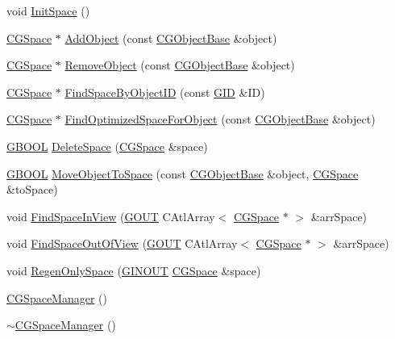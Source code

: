 \begin{DoxyCompactItemize}
void \hyperlink{class_c_g_space_manager_a8ce8e485ec6fcbe1c0d553822cd8e6be}{Init\+Space} ()
\item 
\hyperlink{class_c_g_space}{C\+G\+Space} $\ast$ \hyperlink{class_c_g_space_manager_adb22f39dc9ff5d643a80b4559859cb2b}{Add\+Object} (const \hyperlink{class_c_g_object_base}{C\+G\+Object\+Base} \&object)
\item 
\hyperlink{class_c_g_space}{C\+G\+Space} $\ast$ \hyperlink{class_c_g_space_manager_aff1eb9a2479f7b840d662f399281e378}{Remove\+Object} (const \hyperlink{class_c_g_object_base}{C\+G\+Object\+Base} \&object)
\item 
\hyperlink{class_c_g_space}{C\+G\+Space} $\ast$ \hyperlink{class_c_g_space_manager_addabb24f3c9bfbc87befb98d959d0193}{Find\+Space\+By\+Object\+I\+D} (const \hyperlink{_g_types_8h_a5b96ecb16d8e437977d12cd40aa6f6d8}{G\+I\+D} \&I\+D)
\item 
\hyperlink{class_c_g_space}{C\+G\+Space} $\ast$ \hyperlink{class_c_g_space_manager_ab96fdcf104020b40cede0cfe8439d566}{Find\+Optimized\+Space\+For\+Object} (const \hyperlink{class_c_g_object_base}{C\+G\+Object\+Base} \&object)
\item 
\hyperlink{_g_types_8h_a2901915743626352a6820c5405f556dc}{G\+B\+O\+O\+L} \hyperlink{class_c_g_space_manager_a6adad07bfa994d292b49175f9b531537}{Delete\+Space} (\hyperlink{class_c_g_space}{C\+G\+Space} \&space)
\item 
\hyperlink{_g_types_8h_a2901915743626352a6820c5405f556dc}{G\+B\+O\+O\+L} \hyperlink{class_c_g_space_manager_ae3beb966c501f7305adaa7e7037b7932}{Move\+Object\+To\+Space} (const \hyperlink{class_c_g_object_base}{C\+G\+Object\+Base} \&object, \hyperlink{class_c_g_space}{C\+G\+Space} \&to\+Space)
\item 
void \hyperlink{class_c_g_space_manager_a589bd71d0ccbd424c0e2e4bd4e591d20}{Find\+Space\+In\+View} (\hyperlink{_g_types_8h_a0858ec221262e635612871d70ca233ad}{G\+O\+U\+T} C\+Atl\+Array$<$ \hyperlink{class_c_g_space}{C\+G\+Space} $\ast$ $>$ \&arr\+Space)
\item 
void \hyperlink{class_c_g_space_manager_a5a5ec91ddf3252a0e965a46105100422}{Find\+Space\+Out\+Of\+View} (\hyperlink{_g_types_8h_a0858ec221262e635612871d70ca233ad}{G\+O\+U\+T} C\+Atl\+Array$<$ \hyperlink{class_c_g_space}{C\+G\+Space} $\ast$ $>$ \&arr\+Space)
\item 
void \hyperlink{class_c_g_space_manager_a60fb3254438f9c2ab1a24e8927b88fdf}{Regen\+Only\+Space} (\hyperlink{_g_types_8h_a3fc97b512f82d8e1a710da1235f9142a}{G\+I\+N\+O\+U\+T} \hyperlink{class_c_g_space}{C\+G\+Space} \&space)
\item 
\hyperlink{class_c_g_space_manager_a6e5c5e579baca73ff5521c6f15aa67b4}{C\+G\+Space\+Manager} ()
\item 
\hyperlink{class_c_g_space_manager_a4c9ac952821613668079713b39b7f5a8}{$\sim$\+C\+G\+Space\+Manager} ()
\end{DoxyCompactItemize}
